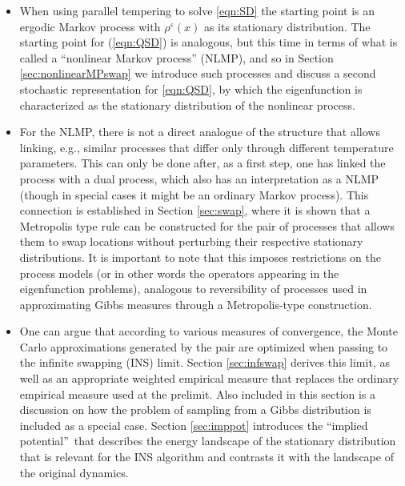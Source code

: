\documentclass[english,11pt]{article}%
\numberwithin{equation}{section}
\numberwithin{example}{section}
\numberwithin{theorem}{section}
\begin{document}
\begin{itemize}
\item When using parallel tempering to solve \eqref{eqn:SD} the starting point
is an ergodic Markov process with $\rho^{\varepsilon}(x)$ as its stationary
distribution. The starting point for (\ref{eqn:QSD}) is analogous, but this
time in terms of what is called a ``nonlinear Markov process'' (NLMP), and so
in Section \ref{sec:nonlinearMPswap} we introduce such processes and discuss a
second stochastic representation for \eqref{eqn:QSD}, by which the
eigenfunction is characterized as the stationary distribution of the nonlinear process.

\item For the NLMP, there is not a direct analogue of the structure that
allows linking, e.g., similar processes that differ only through different
temperature parameters. This can only be done after, as a first step, one has
linked the process with a dual process, which also has an interpretation as a
NLMP (though in special cases it might be an ordinary Markov process). This
connection is established in Section \ref{sec:swap}, where it is shown that a
Metropolis type rule can be constructed for the pair of processes that allows
them to swap locations without perturbing their respective stationary
distributions. It is important to note that this imposes restrictions on the
process models (or in other words the operators appearing in the eigenfunction
problems), analogous to reversibility of processes used in approximating Gibbs
measures through a Metropolis-type construction.

\item One can argue that according to various measures of convergence, the
Monte Carlo approximations generated by the pair are optimized when passing to
the infinite swapping (INS) limit. Section \ref{sec:infswap} derives this
limit, as well as an appropriate weighted empirical measure that replaces the
ordinary empirical measure used at the prelimit. Also included in this section
is a discussion on how the problem of sampling from a Gibbs distribution is
included as a special case.
Section \ref{sec:imppot} introduces the
\textquotedblleft implied potential\textquotedblright\ that describes the
energy landscape of the stationary distribution that is relevant for the INS
algorithm and contrasts it with the landscape of the original dynamics.


\end{itemize}
\end{document}
